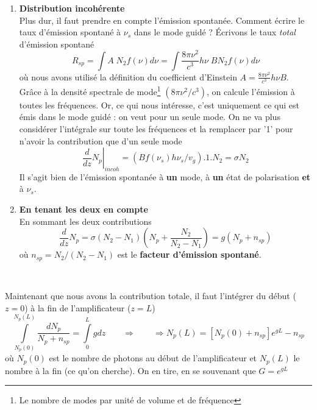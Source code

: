 \begin{enumerate}
\item \textbf{Distribution incohérente}\\
Plus dur, il faut prendre en compte l'émission spontanée. Comment écrire le taux d'émission spontané à 
$\nu_s$ dans le mode guidé ? Écrivons le taux \textit{total} d'émission spontané
\begin{equation}
{R_{sp}} = \int {A\;{N_2}f(\nu )d\nu }  = \int {\frac{{8\pi {\nu ^2}}}{{{c^3}}}h\nu \;B{N_2}f(\nu )d\nu } 
\end{equation}
où nous avons utilisé la définition du coefficient d'Einstein $A = \frac{{8\pi {\nu ^2}}}{{{c^3}}}h\nu B$.
Grâce à la densité spectrale de mode\footnote{Le nombre de modes par unité de volume et de fréquence}  
$(8\pi\nu^2/c^3)$, on calcule l'émission à toutes les fréquences. Or, ce qui nous intéresse, c'est uniquement
ce qui est émis dans le mode guidé : on veut pour un seule mode. On ne va plus considérer l'intégrale sur 
toute les fréquences et la remplacer par '1' pour n'avoir la contribution que d'un seule mode
\begin{equation}
{\left. {\frac{d}{{dz}}{N_p}} \right|_{incoh}} = (Bf({\nu _s})h{\nu _s}/{v_g}).1.{N_2} = \sigma {N_2}
\end{equation}
Il s'agit bien de l'émission spontanée à \textbf{un} mode, à \textbf{un} état de polarisation \textbf{et} à
$\nu_s$.\\

\item \textbf{En tenant les deux en compte}\\
En sommant les deux contributions
\begin{equation}
\frac{d}{{dz}}{N_p} = \sigma ({N_2} - {N_1})({N_p} + \frac{{{N_2}}}{{{N_2} - {N_1}}}) = g({N_p} + {n_{sp}})
\end{equation}
où ${n_{sp}} = {N_2}/({N_2} - {N_1})$ est le \textbf{facteur d'émission spontané}.
\end{enumerate}\ 

Maintenant que nous avons la contribution totale, il faut l'intégrer du début ($z=0$) à la fin de 
l'amplificateur ($z=L$)
\begin{equation}
\int\limits_{{N_p}(0)}^{{N_p}(L)} {\frac{{d{N_p}}}{{{N_p} + {n_{sp}}}} = \int\limits_0^L {gdz} }\qquad
\Rightarrow\qquad
 \Rightarrow {N_p}(L) = [{N_p}(0) + {n_{sp}}]{e^{gL}} - {n_{sp}}
\end{equation}
où $N_p(0)$ est le nombre de photons au début de l'amplificateur et $N_p(L)$ le nombre à la fin (ce qu'on 
cherche). On en tire, en se souvenant que $G=e^{gL}$\\

